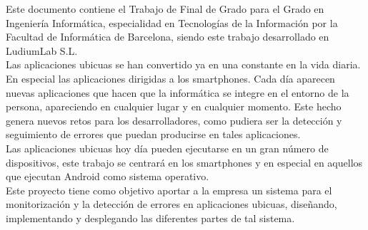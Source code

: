 
\renewenvironment{abstract}
{\small
	\begin{center}
		\bfseries \abstractname\vspace{-.5em}\vspace{0pt}
	\end{center}
	\list{}{%
		\setlength{\leftmargin}{5mm}%
		\setlength{\rightmargin}{\leftmargin}%
	}%
	\item\relax}
{\endlist}

\begin{abstract}
	
	Este documento contiene el Trabajo de Final de Grado para el Grado en Ingeniería Informática, especialidad en Tecnologías de la Información por la Facultad de Informática de Barcelona, siendo este trabajo desarrollado en LudiumLab S.L.		
	\\
	Las aplicaciones ubicuas se han convertido ya en una constante en la vida diaria. En especial las aplicaciones dirigidas a los smartphones. Cada día aparecen nuevas aplicaciones que hacen que la informática se integre en el entorno de la persona, apareciendo en cualquier lugar y en cualquier momento. Este hecho genera nuevos retos para los desarrolladores, como pudiera ser la detección y seguimiento de errores que puedan producirse en tales aplicaciones. 
	\\
	Las aplicaciones ubicuas hoy día pueden ejecutarse en un gran número de dispositivos, este trabajo se centrará en los smartphones y en especial en aquellos que ejecutan Android como sistema operativo.
	\\
	Este proyecto tiene como objetivo aportar a la empresa un sistema para el monitorización y la detección de errores en aplicaciones ubicuas, diseñando, implementando y desplegando las diferentes partes de tal sistema.
		
\end{abstract}